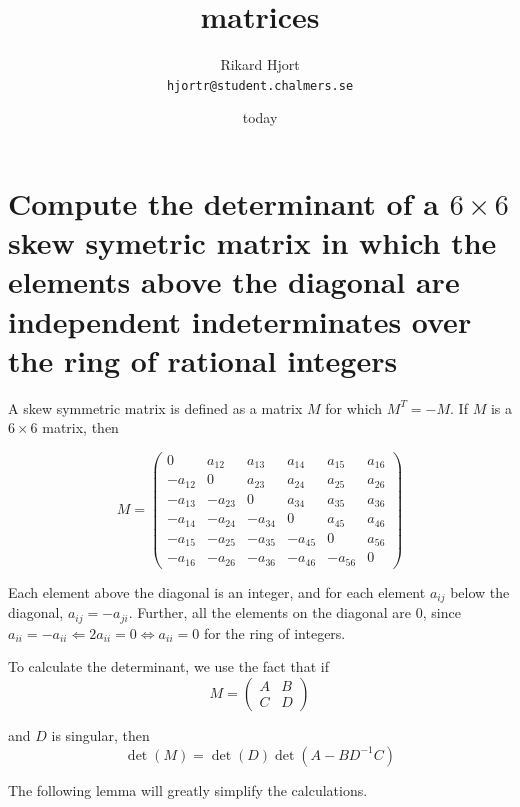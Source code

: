 \documentclass{article}
\author{Rikard Hjort\\\texttt{hjortr@student.chalmers.se}}
\date{today}
\title{\pf matrices}
\begin{document}
\maketitle

\section{Compute the determinant of a $6 \times 6$ skew symetric matrix in which the elements above the diagonal are independent indeterminates over the ring of rational integers}

A skew symmetric matrix is defined as a matrix $M$ for which $M^T = -M$. If $M$
is a $6 \times 6$ matrix, then

\begin{equation*}
M =
\begin{pmatrix}
0 & a_{12} & a_{13} & a_{14} & a_{15} & a_{16} \\
-a_{12} & 0 & a_{23} & a_{24} & a_{25} & a_{26} \\
-a_{13} & -a_{23} & 0 & a_{34} & a_{35} & a_{36} \\
-a_{14} & -a_{24} & -a_{34} & 0 & a_{45} & a_{46} \\
-a_{15} & -a_{25} & -a_{35} & -a_{45} & 0 & a_{56} \\
-a_{16} & -a_{26} & -a_{36} & -a_{46} & -a_{56} & 0
\end{pmatrix}
\end{equation*}

Each element above the diagonal is an integer, and for each element $a_{ij}$
below the diagonal, $a_{ij} = -a_{ji}$. Further, all the elements on the
diagonal are 0, since $a_{ii} = -a_{ii} \Leftarrow 2a_{ii} = 0 \Leftrightarrow
a_{ii} = 0$ for the ring of integers.

To calculate the determinant, we use the fact that if
\begin{equation*}
M =
\begin{pmatrix}
A & B \\
C & D
\end{pmatrix}
\end{equation*}

\noindent and $D$ is singular, then $$\det(M) = \det(D)\det(A - BD^{-1}C)$$

The following lemma will greatly simplify the calculations.
\end{document}
